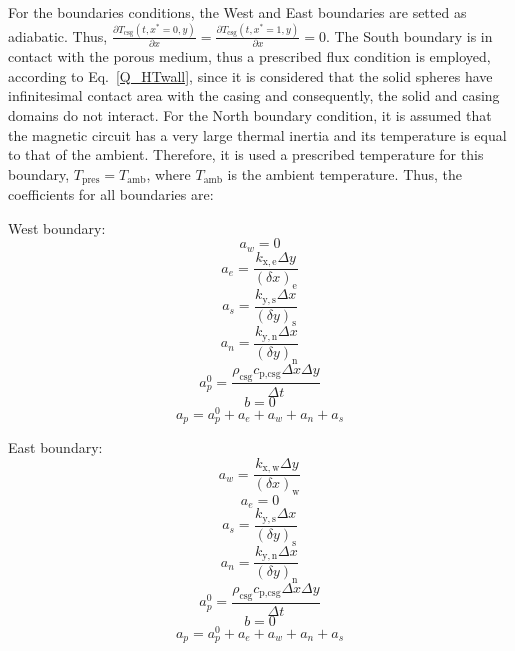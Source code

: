 \documentclass[review,preprint,12pt]{elsarticle}
\begin{document}
For the boundaries conditions, the West and East boundaries are setted as adiabatic. Thus, $\frac{\partial T_\textrm{csg}(t,x^{*}=0,y)}{\partial x} = \frac{\partial T_\textrm{csg}(t,x^{*}=1,y)}{\partial x} = 0$. The South boundary is in contact with the porous medium, thus a prescribed flux condition is employed, according to Eq.~\eqref{Q_HTwall}, since it is considered that the solid spheres have infinitesimal contact area with the casing and consequently, the solid and casing domains do not interact. For the North boundary condition, it is assumed that the magnetic circuit has a very large thermal inertia and its temperature is equal to that of the ambient. Therefore, it is used a prescribed temperature for this boundary, $T_\textrm{pres} = T_\textrm{amb}$, where $T_\textrm{amb}$ is the ambient temperature. Thus, the coefficients for all boundaries are:

West boundary:
\begin{equation}
a_w = 0 \nonumber
\end{equation}
\begin{equation}
a_e = \frac{k_\mathrm{x,e}\Delta y}{(\delta x)_\mathrm{e}} \nonumber
\end{equation}
\begin{equation}
a_s = \frac{k_\mathrm{y,s}\Delta x}{(\delta y)_\mathrm{s}} \nonumber
\end{equation}
\begin{equation}
a_n = \frac{k_\mathrm{y,n}\Delta x}{(\delta y)_\mathrm{n}} \nonumber
\end{equation}
\begin{equation}
a_p^0 = \frac{\rho_\textrm{csg} c_\textrm{p,csg} \Delta x \Delta y}{\Delta t}  \nonumber
\end{equation}
\begin{equation}
b = 0 \nonumber
\end{equation}
\begin{equation}
a_p = a_p^0 + a_e + a_w + a_n + a_s \nonumber
\end{equation}

East boundary:
\begin{equation}
a_w = \frac{k_\mathrm{x,w}\Delta y}{(\delta x)_\mathrm{w}}  \nonumber
\end{equation}
\begin{equation}
a_e = 0 \nonumber
\end{equation}
\begin{equation}
a_s = \frac{k_\mathrm{y,s}\Delta x}{(\delta y)_\mathrm{s}} \nonumber
\end{equation}
\begin{equation}
a_n = \frac{k_\mathrm{y,n}\Delta x}{(\delta y)_\mathrm{n}} \nonumber
\end{equation}
\begin{equation}
a_p^0 = \frac{\rho_\textrm{csg} c_\textrm{p,csg} \Delta x \Delta y}{\Delta t}  \nonumber
\end{equation}
\begin{equation}
b = 0 \nonumber
\end{equation}
\begin{equation}
a_p = a_p^0 + a_e + a_w + a_n + a_s \nonumber
\end{equation}
\end{document}
